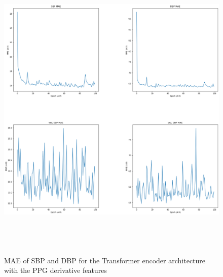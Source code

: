 \begin{figure}[H]
    \centering
    \includegraphics[width=15cm,height=15cm,keepaspectratio]{Results/encoderDeriv.png}
    \caption{MAE of SBP and DBP for the Transformer encoder architecture with the PPG derivative features}
    \label{encoderDerivResults}
\end{figure}

